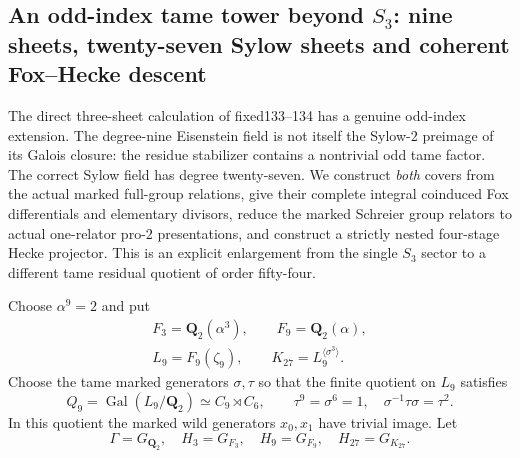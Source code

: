 
\subsection{An odd-index tame tower beyond $S_3$:
nine sheets, twenty-seven Sylow sheets and coherent Fox--Hecke descent}
\label{subsec:dyadic-f135-27sheet-sylow-tower}

The direct three-sheet calculation of fixed133--134
has a genuine odd-index extension.
The degree-nine Eisenstein field is not itself the
Sylow-$2$ preimage of its Galois closure:
the residue stabilizer contains a nontrivial
odd tame factor.  The correct Sylow field has
degree twenty-seven.
We construct \emph{both} covers from the actual
marked full-group relations, give their complete
integral coinduced Fox differentials and
elementary divisors, reduce the marked
Schreier group relators to actual one-relator
pro-$2$ presentations, and construct a
strictly nested four-stage Hecke projector.
This is an explicit enlargement from the
single $S_3$ sector to a different tame
residual quotient of order fifty-four.

Choose $\alpha^9=2$ and put
\begin{equation}\label{eq:dyadic-f135-fields}
\boxed{
\begin{gathered}
F_3=\mathbf Q_2(\alpha^3),\qquad
F_9=\mathbf Q_2(\alpha),\\
L_9=F_9(\zeta_9),\qquad
K_{27}=L_9^{\langle\sigma^3\rangle}.
\end{gathered}}
\end{equation}
Choose the tame marked generators
$\sigma,\tau$ so that the finite quotient
on $L_9$ satisfies
\begin{equation}\label{eq:dyadic-f135-tame-54-quotient}
\boxed{
Q_9=\operatorname{Gal}(L_9/\mathbf Q_2)
\simeq C_9\rtimes C_6,\qquad
\tau^9=\sigma^6=1,\quad
\sigma^{-1}\tau\sigma=\tau^2.
}
\end{equation}
In this quotient the marked wild
generators $x_0,x_1$ have trivial image.
Let
\[
\Gamma=G_{\mathbf Q_2},\quad
H_3=G_{F_3},\quad
H_9=G_{F_9},\quad
H_{27}=G_{K_{27}}.
\]

